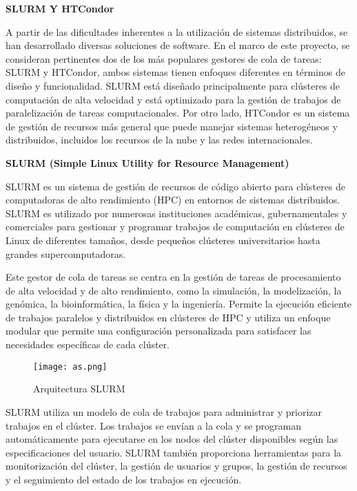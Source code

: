 \begin{spacing}{1.5}
  \textbf{SLURM Y HTCondor}

  A partir de las dificultades inherentes a la utilización de sistemas
  distribuidos, se han desarrollado diversas soluciones de software. En el marco
  de este proyecto, se consideran pertinentes dos de los más populares gestores
  de cola de tareas: SLURM y HTCondor, ambos sistemas tienen enfoques diferentes
  en términos de diseño y funcionalidad. SLURM está diseñado principalmente para
  clústeres de computación de alta velocidad y está optimizado para la gestión de
  trabajos de paralelización de tareas computacionales. Por otro lado, HTCondor
  es un sistema de gestión de recursos más general que puede manejar sistemas
  heterogéneos y distribuidos, incluidos los recursos de la nube y las redes
  internacionales.

  \textbf{SLURM (Simple Linux Utility for Resource Management)}

  SLURM es un sistema de gestión de recursos de código abierto para clústeres
  de computadoras de alto rendimiento (HPC) en entornos de sistemas distribuidos.
  SLURM es utilizado por numerosas instituciones académicas, gubernamentales y
  comerciales para gestionar y programar trabajos de computación en clústeres de
  Linux de diferentes tamaños, desde pequeños clústeres universitarios hasta
  grandes supercomputadoras. \cite{DEF-SLURM}

  Este gestor de cola de tareas se centra en la gestión de tareas de
  procesamiento de alta velocidad y de alto rendimiento, como la simulación, la
  modelización, la genómica, la bioinformática, la física y la ingeniería.
  Permite la ejecución eficiente de trabajos paralelos y distribuidos en
  clústeres de HPC y utiliza un enfoque modular que permite una configuración
  personalizada para satisfacer las necesidades específicas de cada clúster.

  \begin{figure}[h]
    \centering
    \texttt{[image: as.png]}
    \caption{Arquitectura SLURM}
    \label{fig:etiqueta}
  \end{figure}

  SLURM utiliza un modelo de cola de trabajos para administrar y priorizar
  trabajos en el clúster. Los trabajos se envían a la cola y se programan
  automáticamente para ejecutarse en los nodos del clúster disponibles según las
  especificaciones del usuario. SLURM también proporciona herramientas para la
  monitorización del clúster, la gestión de usuarios y grupos, la gestión de
  recursos y el seguimiento del estado de los trabajos en
  ejecución.\cite{DOC-SLURM}
  \vspace{3mm}


\end{spacing}
